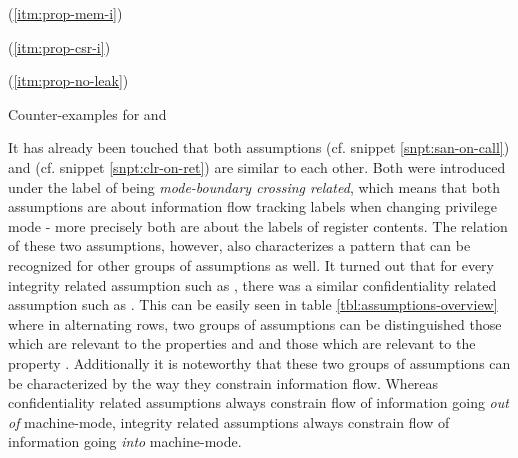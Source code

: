 \begin{table}
    \begin{subtable}{\textwidth}
        \centering
        
        \caption{ (\ref{itm:prop-mem-i})}
        \label{tbl:cex-mem-i-soc}
    \end{subtable}

    \begin{subtable}{\textwidth}
        \centering
        
        \caption{ (\ref{itm:prop-csr-i})}
        \label{tbl:cex-csr-i-soc}
    \end{subtable}

    \begin{subtable}{\textwidth}
        \centering
        
        \caption{ (\ref{itm:prop-no-leak})}
        \label{tbl:cex-no-leak-cor}
    \end{subtable}
    \caption{Counter-examples for  and }
\end{table}

It has already been touched that both assumptions  (cf. snippet \ref{snpt:san-on-call}) and  (cf. snippet \ref{snpt:clr-on-ret}) are similar to each other.
Both were introduced under the label of being \textit{mode-boundary crossing related}, which means that both assumptions are about information flow tracking labels when changing privilege mode - more precisely both are about the labels of register contents.
The relation of these two assumptions, however, also characterizes a pattern that can be recognized for other groups of assumptions as well.
It turned out that for every integrity related assumption such as , there was a similar confidentiality related assumption such as .
This can be easily seen in table \ref{tbl:assumptions-overview} where in alternating rows, two groups of assumptions can be distinguished those which are relevant to the properties  and  and those which are relevant to the property .
Additionally it is noteworthy that these two groups of assumptions can be characterized by the way they constrain information flow.
Whereas confidentiality related assumptions always constrain flow of information going \textit{out of} machine-mode, integrity related assumptions always constrain flow of information going \textit{into} machine-mode.

